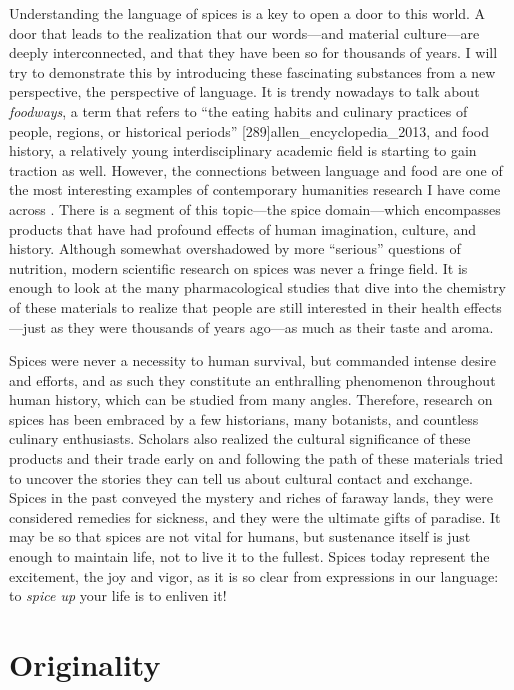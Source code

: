 Understanding the language of spices is a key to open a door to this world. A door that leads to the realization that our words---and material culture---are deeply interconnected, and that they have been so for thousands of years. I will try to demonstrate this by introducing these fascinating substances from a new perspective, the perspective of language. It is trendy nowadays to talk about \textit{foodways}, a term that refers to ``the eating habits and culinary practices of people, regions, or historical periods'' [289]{allen_encyclopedia_2013}, and food history, a relatively young interdisciplinary academic field is starting to gain traction as well. However, the connections between language and food are one of the most interesting examples of contemporary humanities research I have come across \autocite[see][]{jurafsky_language_2014}. There is a segment of this topic---the spice domain---which encompasses products that have had profound effects of human imagination, culture, and history. Although somewhat overshadowed by more ``serious'' questions of nutrition, modern scientific research on spices was never a fringe field. It is enough to look at the many pharmacological studies that dive into the chemistry of these materials to realize that people are still interested in their health effects---just as they were thousands of years ago---as much as their taste and aroma.

Spices were never a necessity to human survival, but commanded intense desire and efforts, and as such they  constitute an enthralling phenomenon throughout human history, which can be studied from many angles. Therefore, research on spices has been embraced by a few historians, many botanists, and countless culinary enthusiasts. Scholars also realized the cultural significance of these products and their trade early on and following the path of these materials tried to uncover the stories they can tell us about cultural contact and exchange. Spices in the past conveyed the mystery and riches of faraway lands, they were considered remedies for sickness, and they were the ultimate gifts of paradise. It may be so that spices are not vital for humans, but sustenance itself is just enough to maintain life, not to live it to the fullest. Spices today represent the excitement, the joy and vigor, as it is so clear from expressions in our language: to \emph{spice up} your life is to enliven it!



\section{Originality}

